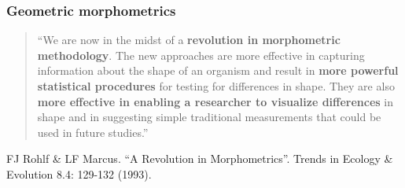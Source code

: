 \begin{frame}
\frametitle{Geometric morphometrics}
\begin{quote}
``We are now in the midst of a {\bf revolution in morphometric methodology}. The new approaches are more effective in capturing information about the shape of an organism and result in {\bf more powerful statistical procedures} for testing for differences in shape. They are also {\bf more effective in enabling a researcher to visualize differences} in shape and in suggesting simple traditional measurements that could be used in future studies.''
\end{quote}

\vspace{0.2cm}

\begin{tiny}
FJ Rohlf \& LF Marcus. ``A Revolution in Morphometrics''. Trends in Ecology \& Evolution 8.4: 129-132 (1993).\par
\end{tiny}
\end{frame}

